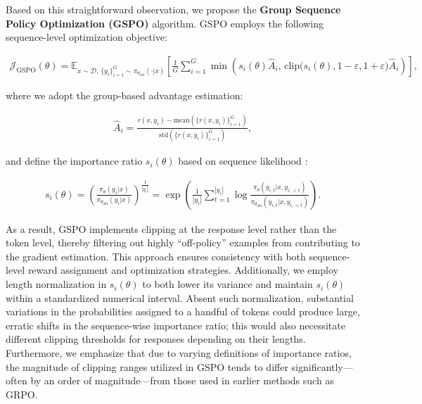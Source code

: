 Based on this straightforward observation, we propose the \textbf{Group Sequence Policy Optimization (GSPO)} algorithm. GSPO employs the following sequence-level optimization objective:

\begin{align}
\mathcal{J}_\text{GSPO} (\theta) = 
\mathbb{E}_{ x \sim \mathcal{D},\, \{y_i\}_{i=1}^G \sim \pi_{\theta_\text{old}}( \cdot | x) }
\left[ 
\frac{1}{G} \sum_{i=1}^{G}
\min \left( s_{i}(\theta)  \widehat{A}_{i},\, \mathrm{clip}\big( s_{i}(\theta), 1 - {\varepsilon}, 1 + {\varepsilon} \big)\widehat{A}_{i} \right)
\right],
\label{equ:gspo}
\end{align}

where we adopt the group-based advantage estimation:

\begin{align}
\widehat{A}_{i} = \frac{r(x, y_i) - \mathrm{mean} \left( \{ r(x, y_i) \}_{i=1}^G \right) }{ \mathrm{std} \left( \{ r(x, y_i) \}_{i=1}^G \right) },
\end{align}

and define the importance ratio $s_{i}(\theta)$ based on sequence likelihood \citep{click}:

\begin{align}
s_{i}(\theta) = \left( \frac{ \pi_{\theta} (y_i | x) }{ \pi_{\theta_\text{old}} (y_i | x)} \right)^{\frac{1}{|y_i|}}
=
\exp \left( \frac{1}{|y_i|} \sum_{t=1}^{|y_i|} \log \frac{ \pi_{\theta} (y_{i,t} | x, y_{i,<t}) }{ \pi_{\theta_\text{old}} (y_{i,t} | x,y_{i,<t})} \right).
\end{align}

As a result, GSPO implements clipping at the response level rather than the token level, thereby filtering out highly “off-policy” examples from contributing to the gradient estimation. This approach ensures consistency with both sequence-level reward assignment and optimization strategies. Additionally, we employ length normalization in $s_{i}(\theta)$ to both lower its variance and maintain $s_{i}(\theta)$ within a standardized numerical interval. Absent such normalization, substantial variations in the probabilities assigned to a handful of tokens could produce large, erratic shifts in the sequence-wise importance ratio; this would also necessitate different clipping thresholds for responses depending on their lengths. Furthermore, we emphasize that due to varying definitions of importance ratios, the magnitude of clipping ranges utilized in GSPO tends to differ significantly—often by an order of magnitude—from those used in earlier methods such as GRPO.

